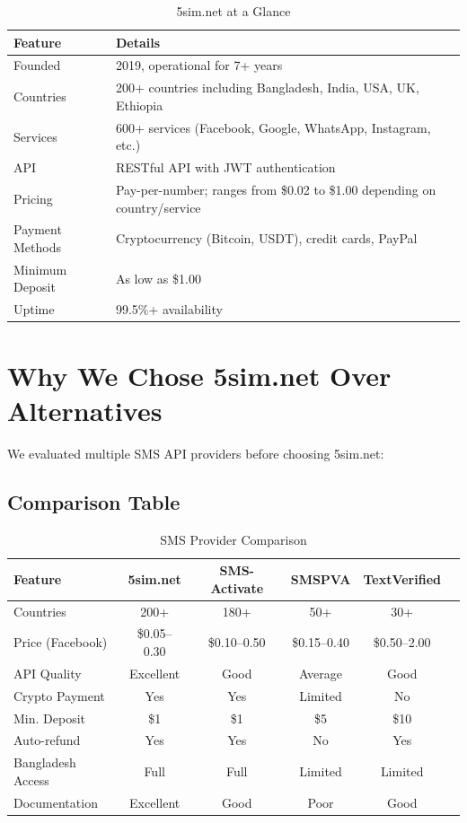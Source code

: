 \begin{table}[H]
\centering
\caption{5sim.net at a Glance}
\begin{tabularx}{\textwidth}{|l|X|}
\hline
\textbf{Feature} & \textbf{Details} \\
\hline
Founded & 2019, operational for 7+ years \\
\hline
Countries & 200+ countries including Bangladesh, India, USA, UK, Ethiopia \\
\hline
Services & 600+ services (Facebook, Google, WhatsApp, Instagram, etc.) \\
\hline
API & RESTful API with JWT authentication \\
\hline
Pricing & Pay-per-number; ranges from \$0.02 to \$1.00 depending on country/service \\
\hline
Payment Methods & Cryptocurrency (Bitcoin, USDT), credit cards, PayPal \\
\hline
Minimum Deposit & As low as \$1.00 \\
\hline
Uptime & 99.5\%+ availability \\
\hline
\end{tabularx}
\end{table}

\section{Why We Chose 5sim.net Over Alternatives}

We evaluated multiple SMS API providers before choosing 5sim.net:

\subsection{Comparison Table}

\begin{table}[H]
\centering
\caption{SMS Provider Comparison}
\begin{tabularx}{\textwidth}{|l|c|c|c|c|X|}
\hline
\textbf{Feature} & \textbf{5sim.net} & \textbf{SMS-Activate} & \textbf{SMSPVA} & \textbf{TextVerified} \\
\hline
Countries & 200+ & 180+ & 50+ & 30+ \\
\hline
Price (Facebook) & \$0.05--0.30 & \$0.10--0.50 & \$0.15--0.40 & \$0.50--2.00 \\
\hline
API Quality & Excellent & Good & Average & Good \\
\hline
Crypto Payment & Yes & Yes & Limited & No \\
\hline
Min. Deposit & \$1 & \$1 & \$5 & \$10 \\
\hline
Auto-refund & Yes & Yes & No & Yes \\
\hline
Bangladesh Access & Full & Full & Limited & Limited \\
\hline
Documentation & Excellent & Good & Poor & Good \\
\hline
\end{tabularx}
\end{table}

